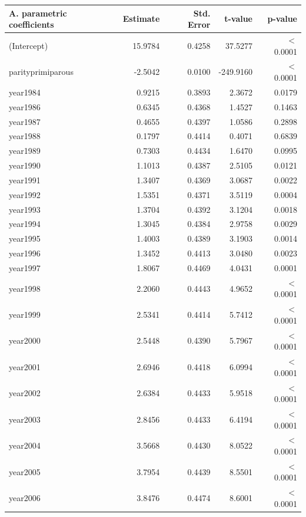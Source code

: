     \begin{table}[H]
    \centering
    \begin{tabular}{lrrrr}
    \textbf{A. parametric coefficients} & Estimate & Std. Error & t-value & p-value \\ 
       \hline
       \hline
      (Intercept) & 15.9784 & 0.4258 & 37.5277 & $<$ 0.0001 \\ 
      parityprimiparous & -2.5042 & 0.0100 & -249.9160 & $<$ 0.0001 \\ 
      year1984 & 0.9215 & 0.3893 & 2.3672 & 0.0179 \\ 
      year1986 & 0.6345 & 0.4368 & 1.4527 & 0.1463 \\ 
      year1987 & 0.4655 & 0.4397 & 1.0586 & 0.2898 \\ 
      year1988 & 0.1797 & 0.4414 & 0.4071 & 0.6839 \\ 
      year1989 & 0.7303 & 0.4434 & 1.6470 & 0.0995 \\ 
      year1990 & 1.1013 & 0.4387 & 2.5105 & 0.0121 \\ 
      year1991 & 1.3407 & 0.4369 & 3.0687 & 0.0022 \\ 
      year1992 & 1.5351 & 0.4371 & 3.5119 & 0.0004 \\ 
      year1993 & 1.3704 & 0.4392 & 3.1204 & 0.0018 \\ 
      year1994 & 1.3045 & 0.4384 & 2.9758 & 0.0029 \\ 
      year1995 & 1.4003 & 0.4389 & 3.1903 & 0.0014 \\ 
      year1996 & 1.3452 & 0.4413 & 3.0480 & 0.0023 \\ 
      year1997 & 1.8067 & 0.4469 & 4.0431 & 0.0001 \\ 
      year1998 & 2.2060 & 0.4443 & 4.9652 & $<$ 0.0001 \\ 
      year1999 & 2.5341 & 0.4414 & 5.7412 & $<$ 0.0001 \\ 
      year2000 & 2.5448 & 0.4390 & 5.7967 & $<$ 0.0001 \\ 
      year2001 & 2.6946 & 0.4418 & 6.0994 & $<$ 0.0001 \\ 
      year2002 & 2.6384 & 0.4433 & 5.9518 & $<$ 0.0001 \\ 
      year2003 & 2.8456 & 0.4433 & 6.4194 & $<$ 0.0001 \\ 
      year2004 & 3.5668 & 0.4430 & 8.0522 & $<$ 0.0001 \\ 
      year2005 & 3.7954 & 0.4439 & 8.5501 & $<$ 0.0001 \\ 
      year2006 & 3.8476 & 0.4474 & 8.6001 & $<$ 0.0001 \\ 

\end{tabular}
\end{table}
